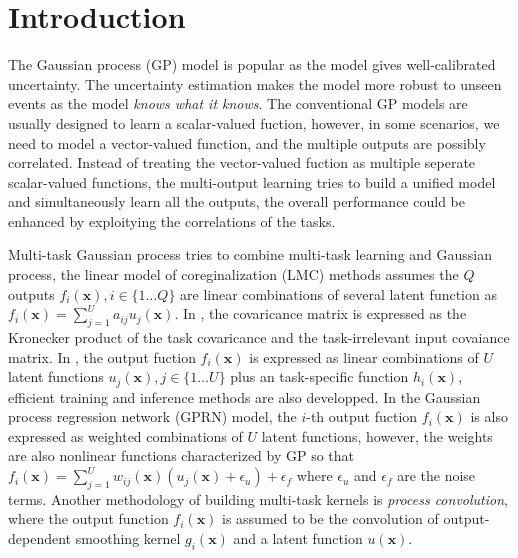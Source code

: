 \section{Introduction}

The Gaussian process (GP) model is popular as the model gives well-calibrated uncertainty. The uncertainty estimation makes the model more robust to unseen events as the model \emph{knows what it knows}. The conventional GP models are usually designed to learn a scalar-valued fuction, however, in some scenarios, we need to model a vector-valued function, and the multiple outputs are possibly correlated. Instead of treating the vector-valued fuction as multiple seperate scalar-valued functions, the multi-output learning\cite{zhang2017survey} tries to build a unified model and simultaneously learn all the outputs, the overall performance could be enhanced by exploitying the correlations of the tasks.

Multi-task Gaussian process\cite{vectorvaluedkernel} tries to combine multi-task learning and Gaussian process, the linear model of coreginalization (LMC) methods\cite{journel1978mining} assumes the $Q$ outputs $f_i(\bm{x}), i \in \{1\dots Q\}$ are linear combinations of several latent function as $f_i(\bm{x}) = \sum_{j=1}^U a_{ij} u_j(\bm{x})$. In \cite{bonilla2008multi}, the covaricance matrix is expressed as the Kronecker product of the task covaricance and the task-irrelevant input covaiance matrix. In \cite{nguyen2014collaborative}, the output fuction $f_i(\bm{x})$ is expressed as linear combinations of $U$ latent functions $u_j(\bm{x}), j \in \{1\dots U\}$ plus an task-specific function $h_i(\bm{x})$, efficient training and inference methods are also developped. In the Gaussian process regression network (GPRN) model, the $i$-th output fuction $f_i(\bm{x})$ is also expressed as weighted combinations of $U$ latent functions, however, the weights are also nonlinear functions characterized by GP so that $f_i(\bm{x}) = \sum_{j=1}^U w_{ij}(\bm{x}) (u_j(\bm{x}) + \epsilon_u) + \epsilon_f$ where $\epsilon_u$ and $\epsilon_f$ are the noise terms. Another methodology of building multi-task kernels is \emph{process convolution}\cite{boyle2005dependent,alvarez2009sparse,alvarez2011computationally}, where the output function $f_i(\bm{x})$ is assumed to be the convolution of output-dependent smoothing kernel $g_i(\bm{x})$ and a latent function $u(\bm{x})$.  


